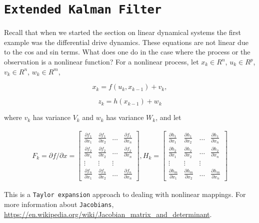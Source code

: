 \hypertarget{extended-kalman-filter}{%
\section{\texorpdfstring{\texttt{Extended\ Kalman\ Filter}}{Extended Kalman Filter}}\label{extended-kalman-filter}}

Recall that when we started the section on linear dynamical systems the
first example was the differential drive dynamics. These equations are
not linear due to the cos and sin terms. What does one do in the case
where the process or the observation is a nonlinear function? For a
nonlinear process, let \(x_k \in R^n\), \(u_k \in R^p\),
\(v_k  \in R^n\), \(w_k  \in R^m\),

\[x_k = f(u_k,x_{k-1}) + v_k,\]

\[z_k = h(x_{k-1})+w_k\]

where \(v_k\) has variance \(V_k\) and \(w_k\) has variance \(W_k\), and
let

\[\begin{aligned}
F_k = \partial f / \partial x = \displaystyle
  \begin{bmatrix} \frac{\partial f_1}{\partial x_1} & \frac{\partial f_1}{\partial x_2}  & \dots &
\frac{\partial f_1}{\partial x_n}  \\[8pt]
\frac{\partial f_2}{\partial x_1} & \frac{\partial f_2}{\partial x_2}  & \dots &
\frac{\partial f_2}{\partial x_n}  \\[8pt] \vdots & \vdots & \vdots \\[8pt]
\frac{\partial f_n}{\partial x_1} & \frac{\partial f_n}{\partial x_2}  & \dots &
\frac{\partial f_n}{\partial x_n}  \end{bmatrix},
\displaystyle H_k = \begin{bmatrix} \frac{\partial h_1}{\partial x_1} & \frac{\partial h_1}{\partial x_2}  & \dots &
\frac{\partial h_1}{\partial x_n}  \\[8pt]
\frac{\partial h_2}{\partial x_1} & \frac{\partial h_2}{\partial x_2}  & \dots &
\frac{\partial h_2}{\partial x_n}  \\[8pt] \vdots & \vdots & \vdots \\[8pt]
\frac{\partial h_m}{\partial x_1} & \frac{\partial h_m}{\partial x_2}  & \dots &
\frac{\partial h_m}{\partial x_n}  \end{bmatrix}
\end{aligned}\]

This is a \texttt{Taylor\ expansion} approach to dealing with nonlinear
mappings. For more information about \texttt{Jacobians},
\url{https://en.wikipedia.org/wiki/Jacobian_matrix_and_determinant}.

